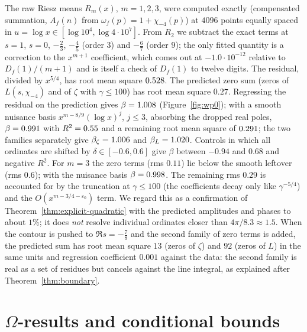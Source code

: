 \documentclass[11pt,a4paper]{article}
\theoremstyle{remark}\newtheorem{remark}[theorem]{Remark}
\begin{document}
The raw Riesz means $R_m(x)$, $m=1,2,3$, were computed exactly (compensated summation, $A_f(n)$ from
$\omega_f(p)=1+\chi_{-4}(p)$) at $4096$ points equally spaced in $u=\log x\in[\log10^4,\log4\cdot10^7]$. From
$R_2$ we subtract the exact terms at $s=1$, $s=0$, $-\tfrac23$, $-\tfrac45$ (order $3$) and $-\tfrac67$ (order
$9$); the only fitted quantity is a correction to the $x^{m+1}$ coefficient, which comes out at
$-1.0\cdot10^{-12}$ relative to $D_f(1)/(m+1)$ and is itself a check of $D_f(1)$ to twelve digits. The residual,
divided by $x^{5/4}$, has root mean square $0.528$. The predicted zero sum (zeros of $L(s,\chi_{-4})$ and of $\zeta$ with $\gamma\le100$) has root mean square $0.27$. Regressing the residual on the prediction
gives $\beta=1.008$ (Figure~\ref{fig:wp0}); with a smooth nuisance basis $x^{m-8/9}(\log x)^j$, $j\le3$,
absorbing the dropped real poles, $\beta=0.991$ with $R^2=0.55$ and a remaining root mean square of
$0.291$; the two families separately give $\beta_\zeta=1.006$ and $\beta_L=1.020$. Controls in
which all ordinates are shifted by $\delta\in[-0.6,0.6]$ give $\beta$ between $-0.94$ and $0.68$ and negative
$R^2$. For $m=3$ the zero terms (rms $0.11$) lie below the smooth leftover (rms $0.6$); with the nuisance basis
$\beta=0.998$. The remaining rms $0.29$ is accounted for by the truncation at $\gamma\le100$
(the coefficients decay only like $\gamma^{-5/4}$) and the $O(x^{m-3/4-\varepsilon_0})$ term. We regard this as
a confirmation of Theorem~\ref{thm:explicit-quadratic} with the predicted amplitudes and phases to about
$1\%$; it does \emph{not} resolve individual ordinates closer than $4\pi/8.3\approx1.5$. When the contour is pushed
to $\Re s=-\tfrac78$ and the second family of zero terms is added, the predicted sum has root mean square
$13$ (zeros of $\zeta$) and $92$ (zeros of $L$) in the same units and regression coefficient $0.001$ against the
data: the second family is real as a set of residues but cancels against the line integral, as explained
after Theorem~\ref{thm:boundary}.

\section{$\Omega$-results and conditional bounds}\label{sec:omega}
\end{document}
